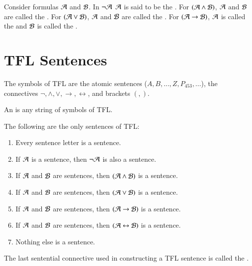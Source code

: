 \begin{definition}
    Consider formulas $\mathcal{A}$ and $\mathcal{B}$. In $\lnot \mathcal{A}$ $\mathcal{A}$ is said to be the . For $(\mathcal{A} \wedge \mathcal{B})$, $\mathcal{A}$ and $\mathcal{B}$ are called the . For $(\mathcal{A} \lor \mathcal{B})$, $\mathcal{A}$ and $\mathcal{B}$ are called the . For $(\mathcal{A} \rightarrow \mathcal{B})$, $\mathcal{A}$ is called the  and $\mathcal{B}$ is called the .
\end{definition}


\section{ TFL Sentences}

\begin{definition}
    The symbols of TFL are the atomic sentences ($A,B,...,Z,P_{453},...$), the connectives $\lnot,\wedge,\lor,\rightarrow,\leftrightarrow$, and brackets $(,)$.
\end{definition}

\begin{definition}
    An  is any string of symbols of TFL.
\end{definition}


\begin{definition}
    The following are the only sentences of TFL:
    \begin{enumerate}
        \item Every sentence letter is a sentence.
        \item If $\mathcal{A}$ is a sentence, then $\lnot \mathcal{A}$ is also a sentence.
        \item If $\mathcal{A}$ and $\mathcal{B}$ are sentences, then $(\mathcal{A}\wedge \mathcal{B})$ is a sentence.
        \item If $\mathcal{A}$ and $\mathcal{B}$ are sentences, then $(\mathcal{A}\lor \mathcal{B})$ is a sentence.
        \item If $\mathcal{A}$ and $\mathcal{B}$ are sentences, then $(\mathcal{A}\rightarrow \mathcal{B})$ is a sentence.
        \item If $\mathcal{A}$ and $\mathcal{B}$ are sentences, then $(\mathcal{A}\leftrightarrow \mathcal{B})$ is a sentence.
        \item Nothing else is a sentence.
    \end{enumerate}
    The last sentential connective used in constructing a TFL sentence is called the .
\end{definition}


